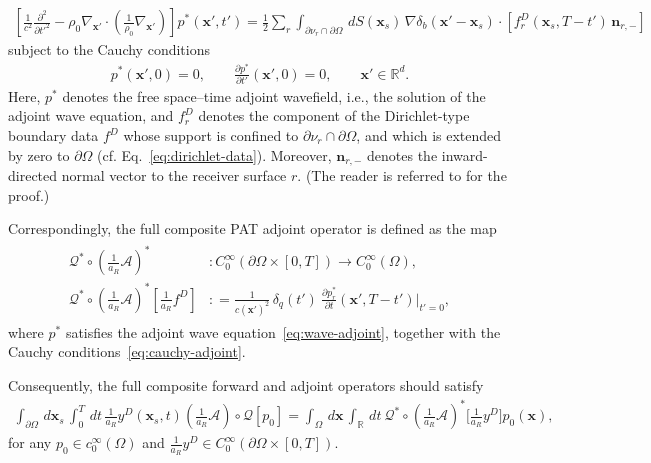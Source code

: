 \documentclass[11pt,reqno]{amsart}
\theoremstyle{remark}
\newcommand{\bx}{\boldsymbol{x}}
\newcommand{\bn}{\boldsymbol{n}}
\begin{document}
\begin{align}  \label{eq:wave-adjoint}
\left[
\frac{1}{c^2}\frac{\partial^2}{\partial t'^2}
-
\rho_0 \nabla_{\bx'} \cdot
\left(
\frac{1}{\rho_0}\nabla_{\bx'}
\right)
\right]
p^*(\bx',t')
=
\frac{1}{2}  \sum_r
\int_{\partial \nu_r \cap \partial \Omega}
\, dS(\bx_s)  \,
\nabla \delta_b(\bx'-\bx_s)
\cdot
\left[
f_r^D(\bx_s,T-t')\,\bn_{r,-}
\right]
\end{align}
subject to the Cauchy conditions
\begin{align}   \label{eq:cauchy-adjoint}
p^*(\bx',0)=0,
\qquad
\frac{\partial p^*}{\partial t'}(\bx',0)=0,
\qquad
\bx' \in \mathbb{R}^d .
\end{align}
Here, \(p^*\) denotes the free space--time adjoint wavefield, i.e., the solution of the adjoint wave equation, and \(f_r^D\) denotes the component of the Dirichlet-type boundary data \(f^D\) whose support is confined to \( \partial \nu_r \cap \partial \Omega \), and which is extended by zero to \(\partial \Omega\) (cf. Eq.~\eqref{eq:dirichlet-data}). Moreover, \(\bn_{r,-}\) denotes the inward-directed normal vector to the receiver surface \(r\). (The reader is referred to \cite{Javaherian2022} for the proof.)


Correspondingly, the full composite PAT adjoint operator is defined as the map
\begin{align}  \label{eq:full-operator-adjoint}
\begin{split}
\mathcal{Q}^* \circ \left(\frac{1}{a_R}\mathcal{A}\right)^*         & :  C_0^{\infty}\left(\partial \Omega \times [0,T]\right)  \rightarrow  C_0^{\infty}(\Omega),\\
\mathcal{Q}^* \circ \left(\frac{1}{a_R}\mathcal{A}\right)^* [\frac{1}{a_R} f^D]& : =   \frac{1}{c(\bx')^2}  \, \delta_q(t') \ \frac{\partial p_r^* }{\partial t}(\bx', T-t') \rvert_{t'=0},
\end{split}
\end{align}
where \(p^*\) satisfies the adjoint wave equation~\eqref{eq:wave-adjoint}, together with the Cauchy conditions~\eqref{eq:cauchy-adjoint}.


Consequently, the full composite forward and adjoint operators should satisfy
\begin{align} \label{eq:inner-product-test}
\int_{\partial \Omega} \, d \bx_s \,  \int_0^T  \, dt \, \frac{1}{a_R} y^D(\bx_s,t) \left(  \frac{1}{a_R} \mathcal{A} \right) \circ \mathcal{Q} [p_0]  = \int_{\Omega} \, d \bx   \,  \int_{\mathbb{R}} \,  dt \ \mathcal{Q}^*\circ  \left(  \frac{1}{a_R} \mathcal{A} \right)^* \big[ \frac{1}{a_R} y^D\big] p_0(\bx),
\end{align}
for any \( p_0 \in c_0^\infty\left(\Omega\right) \) and \( \frac{1}{a_R} y^D \in C_0^\infty \left(\partial \Omega \times [0,T]\right) \).
\end{document}
